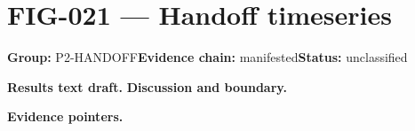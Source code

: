 \clearpage
\section{FIG-021 --- Handoff timeseries}
\label{figpage:fig-021}
\textbf{Group:} P2-HANDOFF\quad \textbf{Evidence chain:} manifested\quad \textbf{Status:} unclassified

\textbf{Results text draft.} 
\textbf{Discussion and boundary.} 


\textbf{Evidence pointers.}



\vfill
